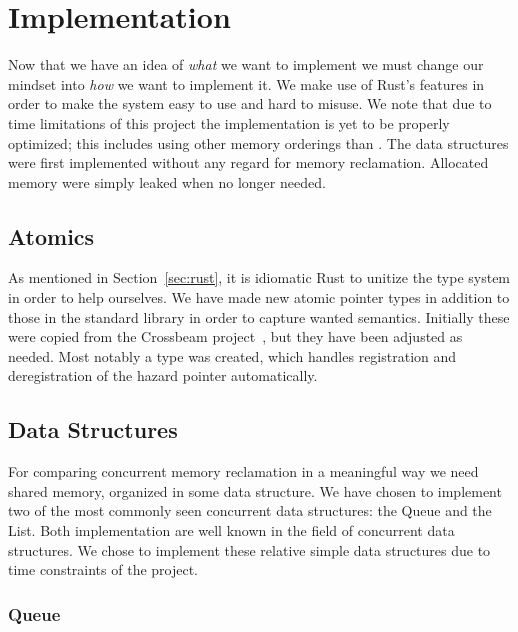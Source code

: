 \documentclass[b5paper]{report}
\begin{document}
\section{Implementation}

Now that we have an idea of \emph{what} we want to implement we must change our
mindset into \emph{how} we want to implement it. We make use of Rust's features
in order to make the system easy to use and hard to misuse.  We note that due to
time limitations of this project the implementation is yet to be properly
optimized; this includes using other memory orderings than . The
data structures were first implemented without any regard for memory
reclamation.  Allocated memory were simply leaked when no longer needed.


\subsection{Atomics\label{sec:atomics}}

As mentioned in Section~\ref{sec:rust}, it is idiomatic Rust to unitize the type
system in order to help ourselves. We have made new atomic pointer types in
addition to those in the standard library in order to capture wanted semantics.
Initially these were copied from the Crossbeam project~\cite{crossbeam-msqueue},
but they have been adjusted as needed. Most notably a  type was
created, which handles registration and deregistration of the hazard pointer
automatically.


\subsection{Data Structures\label{sec:data-structures}}

For comparing concurrent memory reclamation in a meaningful way we need shared
memory, organized in some data structure. We have chosen to implement two of the
most commonly seen concurrent data structures: the Queue and the List. Both
implementation are well known in the field of concurrent data structures. We
chose to implement these relative simple data structures due to time constraints
of the project.


\subsubsection{Queue}
\end{document}
